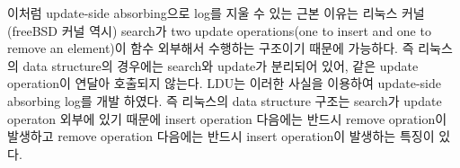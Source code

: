 








\fi


\ifkor
이처럼 update-side absorbing으로 log를 지울 수 있는 근본 이유는 리눅스 커널(freeBSD 커널 역시)
search가 two update operations(one to insert and one to remove an element)이 함수
외부해서 수행하는 구조이기 때문에 가능하다.
즉 리눅스의 data structure의 경우에는 search와 update가 분리되어 있어, 같은 update
operation이 연달아 호출되지 않는다.
LDU는 이러한 사실을 이용하여 update-side absorbing log를 개발 하였다. 
즉 리눅스의 data structure 구조는 search가 update operaton 외부에 있기 때문에 insert operation
다음에는 반드시 remove opration이 발생하고 remove operation 다음에는 반드시 insert operation이 발생하는
특징이 있다. %
\else








